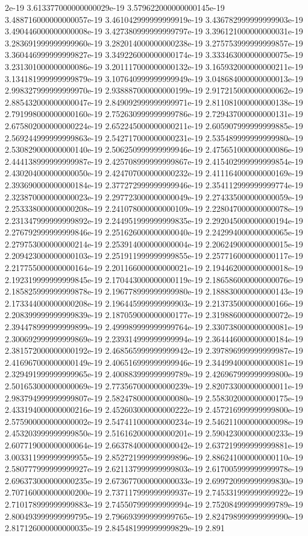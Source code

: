 2e-19	3.613377000000000029e-19	3.579622000000000145e-19	3.488716000000000057e-19	3.461042999999999919e-19	3.436782999999999903e-19	3.490446000000000008e-19	3.427380999999999797e-19	3.396121000000000031e-19	3.283691999999999960e-19	3.282014000000000238e-19	3.275753999999999857e-19	3.360446999999999827e-19	3.349226000000000174e-19	3.333463000000000075e-19	3.231301000000000086e-19	3.201117000000000132e-19	3.165932000000000211e-19	3.134181999999999879e-19	3.107640999999999949e-19	3.048684000000000013e-19	2.998327999999999970e-19	2.938887000000000199e-19	2.917215000000000062e-19	2.885432000000000047e-19	2.849092999999999971e-19	2.811081000000000138e-19	2.791998000000000160e-19	2.752630999999999786e-19	2.729437000000000131e-19	2.675802000000000224e-19	2.652245000000000211e-19	2.605907999999999885e-19	2.569244999999999863e-19	2.542717000000000231e-19	2.535489999999999980e-19	2.530829000000000140e-19	2.506250999999999946e-19	2.475651000000000086e-19	2.444138999999999987e-19	2.425708999999999867e-19	2.415402999999999854e-19	2.430204000000000050e-19	2.424707000000000232e-19	2.411164000000000169e-19	2.393690000000000184e-19	2.377272999999999946e-19	2.354112999999999774e-19	2.323870000000000023e-19	2.297723000000000049e-19	2.274335000000000059e-19	2.253338000000000208e-19	2.241078000000000109e-19	2.228047000000000078e-19	2.231347999999999892e-19	2.244951999999999835e-19	2.292045000000000194e-19	2.276792999999999846e-19	2.251626000000000040e-19	2.242994000000000065e-19	2.279753000000000214e-19	2.253914000000000004e-19	2.206249000000000015e-19	2.209423000000000103e-19	2.251911999999999855e-19	2.257716000000000117e-19	2.217755000000000164e-19	2.201166000000000021e-19	2.194462000000000018e-19	2.192319999999999845e-19	2.170443000000000119e-19	2.186586000000000076e-19	2.185825999999999878e-19	2.196778999999999980e-19	2.188830000000000143e-19	2.173344000000000208e-19	2.196445999999999903e-19	2.213735000000000166e-19	2.208399999999999839e-19	2.187059000000000177e-19	2.319886000000000072e-19	2.394478999999999899e-19	2.499989999999999764e-19	2.330738000000000081e-19	2.300692999999999869e-19	2.239314999999999994e-19	2.364446000000000184e-19	2.381572000000000192e-19	2.468565999999999942e-19	2.397896999999999987e-19	2.416967000000000149e-19	2.406516999999999946e-19	2.344994000000000081e-19	2.329491999999999965e-19	2.400883999999999789e-19	2.426967999999999800e-19	2.501653000000000069e-19	2.773567000000000239e-19	2.820733000000000011e-19	2.983794999999999807e-19	2.582478000000000080e-19	2.558302000000000175e-19	2.433194000000000216e-19	2.452603000000000222e-19	2.457216999999999800e-19	2.575900000000000002e-19	2.547411000000000234e-19	2.546211000000000098e-19	2.453203999999999850e-19	2.516162000000000201e-19	2.590423000000000233e-19	2.607719000000000064e-19	2.663784000000000042e-19	2.637219999999999881e-19	3.003311999999999955e-19	2.852721999999999896e-19	2.886241000000000110e-19	2.580777999999999927e-19	2.621137999999999803e-19	2.617005999999999978e-19	2.696373000000000235e-19	2.673677000000000033e-19	2.699720999999999830e-19	2.707160000000000200e-19	2.737117999999999937e-19	2.745331999999999922e-19	2.710178999999999883e-19	2.745507999999999994e-19	2.752084999999999789e-19	2.800493999999999795e-19	2.796693999999999765e-19	2.824798999999999990e-19	2.817126000000000035e-19	2.845481999999999829e-19	2.891